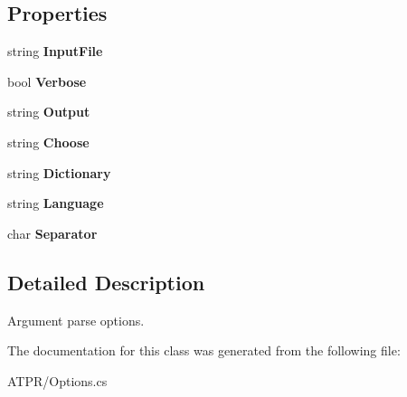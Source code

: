 \subsection*{Properties}
\begin{DoxyCompactItemize}
\item 
\hypertarget{class_a_t_p_r_1_1_options_ac0a2d51d6f7ef81700651d3951f51e4f}{}\label{class_a_t_p_r_1_1_options_ac0a2d51d6f7ef81700651d3951f51e4f} 
string {\bfseries Input\+File}
\item 
\hypertarget{class_a_t_p_r_1_1_options_a8cb44ee6dbab360a3d9412626c2fa2d9}{}\label{class_a_t_p_r_1_1_options_a8cb44ee6dbab360a3d9412626c2fa2d9} 
bool {\bfseries Verbose}
\item 
\hypertarget{class_a_t_p_r_1_1_options_a933d1d83e25d63f9b006c48efe3b4fd1}{}\label{class_a_t_p_r_1_1_options_a933d1d83e25d63f9b006c48efe3b4fd1} 
string {\bfseries Output}
\item 
\hypertarget{class_a_t_p_r_1_1_options_a2b57c8aeea07cb4359ca235c24cd6cfe}{}\label{class_a_t_p_r_1_1_options_a2b57c8aeea07cb4359ca235c24cd6cfe} 
string {\bfseries Choose}
\item 
\hypertarget{class_a_t_p_r_1_1_options_a5187c31694e58eb5cd7464b3c1f5eacc}{}\label{class_a_t_p_r_1_1_options_a5187c31694e58eb5cd7464b3c1f5eacc} 
string {\bfseries Dictionary}
\item 
\hypertarget{class_a_t_p_r_1_1_options_af1d36310babdada573488c4795ee9a92}{}\label{class_a_t_p_r_1_1_options_af1d36310babdada573488c4795ee9a92} 
string {\bfseries Language}
\item 
\hypertarget{class_a_t_p_r_1_1_options_ab40c002e4eeede247c68606cb3481a0f}{}\label{class_a_t_p_r_1_1_options_ab40c002e4eeede247c68606cb3481a0f} 
char {\bfseries Separator}
\end{DoxyCompactItemize}


\subsection{Detailed Description}
Argument parse options. 



The documentation for this class was generated from the following file\+:\begin{DoxyCompactItemize}
\item 
A\+T\+P\+R/Options.\+cs\end{DoxyCompactItemize}
